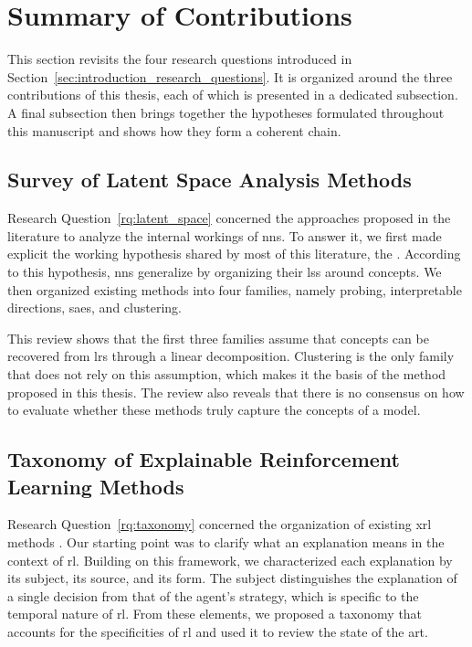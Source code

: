 \section{Summary of Contributions}
\label{sec:conclusion_summary_of_contributions}

This section revisits the four research questions introduced in Section~\ref{sec:introduction_research_questions}.
It is organized around the three contributions of this thesis, each of which is presented in a dedicated subsection.
A final subsection then brings together the hypotheses formulated throughout this manuscript and shows how they form a coherent chain.

\subsection{Survey of Latent Space Analysis Methods}

Research Question~\ref{rq:latent_space} concerned the approaches proposed in the literature to analyze the internal workings of \glspl{nn}.
To answer it, we first made explicit the working hypothesis shared by most of this literature, the \ConceptHypothesisName.
According to this hypothesis, \glspl{nn} generalize by organizing their \glspl{ls} around concepts.
We then organized existing methods into four families, namely probing, interpretable directions, \glspl{sae}, and clustering.

This review shows that the first three families assume that concepts can be recovered from \glspl{lr} through a linear decomposition.
Clustering is the only family that does not rely on this assumption, which makes it the basis of the method proposed in this thesis.
The review also reveals that there is no consensus on how to evaluate whether these methods truly capture the concepts of a model.

\subsection{Taxonomy of Explainable Reinforcement Learning Methods}

Research Question~\ref{rq:taxonomy} concerned the organization of existing \gls{xrl} methods \parencite{alaarabiou:hal-04685607, alaarabiou2026taxonomy}.
Our starting point was to clarify what an explanation means in the context of \gls{rl}.
Building on this framework, we characterized each explanation by its subject, its source, and its form.
The subject distinguishes the explanation of a single decision from that of the agent's strategy, which is specific to the temporal nature of \gls{rl}.
From these elements, we proposed a taxonomy that accounts for the specificities of \gls{rl} and used it to review the state of the art.

